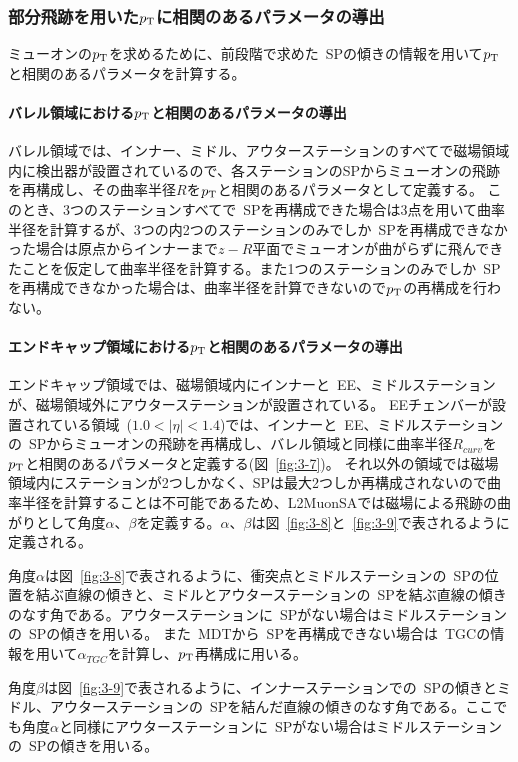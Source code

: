 \subsubsection{部分飛跡を用いた$p_\mathrm{T}$に相関のあるパラメータの導出}
ミューオンの$p_\mathrm{T}$を求めるために、前段階で求めた~SPの傾きの情報を用いて$p_\mathrm{T}$と相関のあるパラメータを計算する。

\paragraph{バレル領域における$p_\mathrm{T}$と相関のあるパラメータの導出}
バレル領域では、インナー、ミドル、アウターステーションのすべてで磁場領域内に検出器が設置されているので、各ステーションのSPからミューオンの飛跡を再構成し、その曲率半径$R$を$p_\mathrm{T}$と相関のあるパラメータとして定義する。
このとき、3つのステーションすべてで~SPを再構成できた場合は3点を用いて曲率半径を計算するが、3つの内2つのステーションのみでしか~SPを再構成できなかった場合は原点からインナーまで$z-R$平面でミューオンが曲がらずに飛んできたことを仮定して曲率半径を計算する。また1つのステーションのみでしか~SPを再構成できなかった場合は、曲率半径を計算できないので$p_\mathrm{T}$の再構成を行わない。


\paragraph{エンドキャップ領域における$p_\mathrm{T}$と相関のあるパラメータの導出}
エンドキャップ領域では、磁場領域内にインナーと~EE、ミドルステーションが、磁場領域外にアウターステーションが設置されている。
EEチェンバーが設置されている領域~($1.0<|\eta|<1.4$)では、インナーと~EE、ミドルステーションの~SPからミューオンの飛跡を再構成し、バレル領域と同様に曲率半径$R_{curv}$を$p_\mathrm{T}$と相関のあるパラメータと定義する(図~\ref{fig:3-7})。
それ以外の領域では磁場領域内にステーションが2つしかなく、SPは最大2つしか再構成されないので曲率半径を計算することは不可能であるため、L2MuonSAでは磁場による飛跡の曲がりとして角度$\alpha$、$\beta$を定義する。$\alpha$、$\beta$は図~\ref{fig:3-8}と~\ref{fig:3-9}で表されるように定義される。

角度$\alpha$は図~\ref{fig:3-8}で表されるように、衝突点とミドルステーションの~SPの位置を結ぶ直線の傾きと、ミドルとアウターステーションの~SPを結ぶ直線の傾きのなす角である。アウターステーションに~SPがない場合はミドルステーションの~SPの傾きを用いる。
また~MDTから~SPを再構成できない場合は~TGCの情報を用いて$\alpha_{TGC}$を計算し、$p_\mathrm{T}$再構成に用いる。

角度$\beta$は図~\ref{fig:3-9}で表されるように、インナーステーションでの~SPの傾きとミドル、アウターステーションの~SPを結んだ直線の傾きのなす角である。ここでも角度$\alpha$と同様にアウターステーションに~SPがない場合はミドルステーションの~SPの傾きを用いる。

